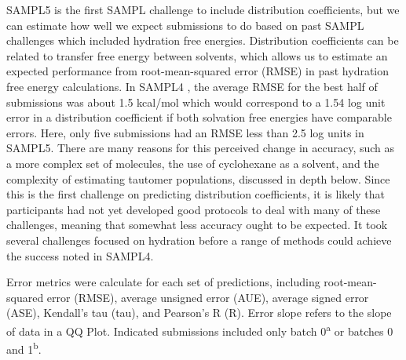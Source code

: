 SAMPL5 is the first SAMPL challenge to include distribution coefficients, but we can estimate how well we expect submissions to do based on past SAMPL challenges which included hydration free energies. 
Distribution coefficients can be related to transfer free energy between solvents, which allows us to estimate an expected performance from root-mean-squared error (RMSE) in past hydration free energy calculations. 
In SAMPL4  \cite{Mobley:2014gu}, the average RMSE for the best half of submissions was about 1.5 kcal/mol which would correspond to a 1.54 log unit error in a distribution coefficient if both solvation free energies have comparable errors. 
Here, only five submissions had an RMSE less than 2.5 log units in SAMPL5. 
There are many reasons for this perceived change in accuracy, such as a more complex set of molecules, the use of cyclohexane as a solvent, and the complexity of estimating tautomer populations, discussed in depth below. 
Since this is the first challenge on predicting distribution coefficients, it is likely that participants had not yet developed good protocols to deal with many of these challenges, meaning that somewhat less accuracy ought to be expected.
It took several challenges focused on hydration \cite{Mobley:2014gu,Geballe:2012fc,Geballe:2010jr,Klimovich:2010jm,Mobley:2009iu,Mobley:2012jwa,Nicholls:2008cx}  before a range of methods could achieve the success noted in SAMPL4.
 
\begin{table}
\scriptsize

\label{groupStats}
\caption{Error metrics were calculate for each set of predictions, including root-mean-squared error (RMSE), average unsigned error (AUE), average signed error (ASE), Kendall's tau (tau), and Pearson's R (R). Error slope refers to the slope of data in a QQ Plot. Indicated submissions included only batch 0\textsuperscript{a} or batches 0 and 1\textsuperscript{b}.} 
\end{table}

